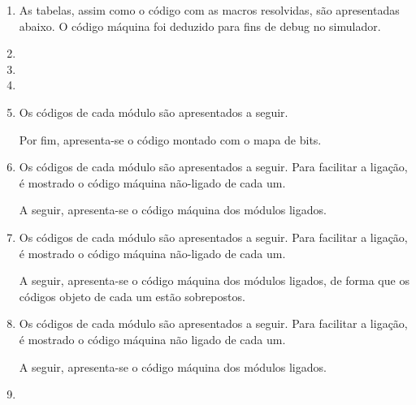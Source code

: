 \begin{enumerate}
    \item
    As tabelas, assim como o código com as macros resolvidas, são apresentadas abaixo.
    O código máquina foi deduzido para fins de debug no simulador.

    
    \item

    \item

    \item 
    
    \item
    Os códigos de cada módulo são apresentados a seguir.
    
    Por fim, apresenta-se o código montado com o mapa de bits.

    \item
    Os códigos de cada módulo são apresentados a seguir.
    Para facilitar a ligação, é mostrado 
    o código máquina não-ligado de cada um.

    A seguir, apresenta-se o código máquina dos módulos ligados.

    \item
    Os códigos de cada módulo são apresentados a seguir.
    Para facilitar a ligação, é mostrado 
    o código máquina não-ligado de cada um.

    A seguir, apresenta-se o código máquina dos módulos ligados,
    de forma que os códigos objeto de cada um estão sobrepostos.

    \item
    Os códigos de cada módulo são apresentados a seguir.
    Para facilitar a ligação, é mostrado 
    o código máquina não ligado de cada um.

    A seguir, apresenta-se o código máquina dos módulos ligados.

    \item
\end{enumerate}